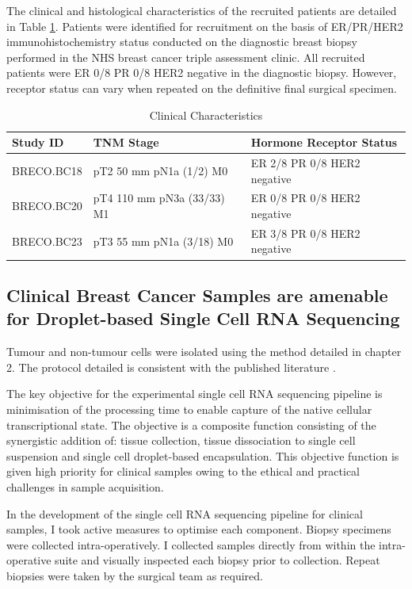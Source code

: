 The clinical and histological characteristics of the recruited patients are detailed in Table \ref{tab: clinical_characteristics}. Patients were identified for recruitment on the basis of ER/PR/HER2 immunohistochemistry status conducted on the diagnostic breast biopsy performed in the NHS breast cancer triple assessment clinic. All recruited patients were ER 0/8 PR 0/8 HER2 negative in the diagnostic biopsy. However, receptor status can vary when repeated on the definitive final surgical specimen.

\begin{table}
	\centering
	\begin{tabular}{l | l | l}
		Study ID & TNM Stage & Hormone Receptor Status \\
		\hline
		BRECO.BC18 & pT2 50 mm pN1a (1/2) M0 & ER 2/8 PR 0/8 HER2 negative \\
		BRECO.BC20 & pT4 110 mm pN3a (33/33) M1 & ER 0/8 PR 0/8 HER2 negative \\
		BRECO.BC23 & pT3 55 mm pN1a (3/18) M0 & ER 3/8 PR 0/8 HER2 negative \\
		\hline
	\end{tabular}
	\caption{Clinical Characteristics}
	\label{tab: clinical_characteristics}
\end{table}

\subsection{Clinical Breast Cancer Samples are amenable for Droplet-based Single Cell RNA Sequencing}
Tumour and non-tumour cells were isolated using the method detailed in chapter 2. The protocol detailed is consistent with the published literature \cite{Bassez2021}.

The key objective for the experimental single cell RNA sequencing pipeline is minimisation of the processing time to enable capture of the native cellular transcriptional state. The objective is a composite function consisting of the synergistic addition of: tissue collection, tissue dissociation to single cell suspension and single cell droplet-based encapsulation. This objective function is given high priority for clinical samples owing to the ethical and practical challenges in sample acquisition.

In the development of the single cell RNA sequencing pipeline for clinical samples, I took active measures to optimise each component. Biopsy specimens were collected intra-operatively. I collected samples directly from within the intra-operative suite and visually inspected each biopsy prior to collection. Repeat biopsies were taken by the surgical team as required.

